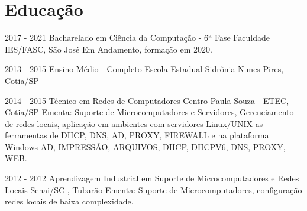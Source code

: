 \documentclass[]{friggeri-cv}
\begin{document}
\section{Educação}
\begin{entrylist}
  \entry
    {2017 - 2021}
    {Bacharelado em Ciência da Computação - 6ª Fase}
    {Faculdade IES/FASC, São José}
    {Em Andamento, formação em 2020.}
    
    \entry
    {2013 - 2015}
    {Ensino Médio - Completo}
    {Escola Estadual Sidrônia Nunes Pires, Cotia/SP}

  \entry
    {2014 - 2015}
    {Técnico em Redes de Computadores}
    {Centro Paula Souza - ETEC, Cotia/SP}
    {Ementa: Suporte de Microcomputadores e Servidores, Gerenciamento de redes locais, aplicação em ambientes com servidores Linux/UNIX as ferramentas de DHCP, DNS, AD, PROXY, FIREWALL e na plataforma Windows AD, IMPRESSÃO, ARQUIVOS, DHCP, DHCPV6, DNS, PROXY, WEB.}
    
  \entry
    {2012 - 2012}
    {Aprendizagem Industrial em Suporte de Microcomputadores e Redes Locais}
    {Senai/SC , Tubarão}
    {Ementa: Suporte de Microcomputadores, configuração redes locais de baixa complexidade.}
  
\end{entrylist}
\end{document}
